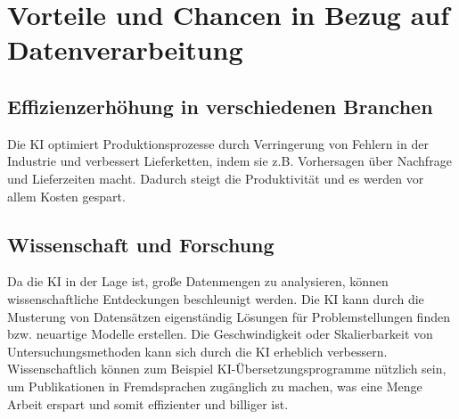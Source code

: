 \chapter{Vorteile und Chancen in Bezug auf Datenverarbeitung}
\label{chap:chancen}

\section{Effizienzerhöhung in verschiedenen Branchen}

Die KI optimiert Produktionsprozesse durch Verringerung von Fehlern in der Industrie und verbessert Lieferketten, indem sie z.B. Vorhersagen über Nachfrage und Lieferzeiten macht. Dadurch steigt die Produktivität und es werden vor allem Kosten gespart. 

\section{Wissenschaft und Forschung}

Da die KI in der Lage ist, große Datenmengen zu analysieren, können wissenschaftliche Entdeckungen beschleunigt werden. Die KI kann durch die Musterung von Datensätzen eigenständig Lösungen für Problemstellungen finden bzw. neuartige Modelle erstellen. Die Geschwindigkeit oder Skalierbarkeit von Untersuchungsmethoden kann sich durch die KI erheblich verbessern. Wissenschaftlich können zum Beispiel KI-Übersetzungsprogramme nützlich sein, um Publikationen in Fremdsprachen zugänglich zu machen, was eine Menge Arbeit erspart und somit effizienter und billiger ist.
